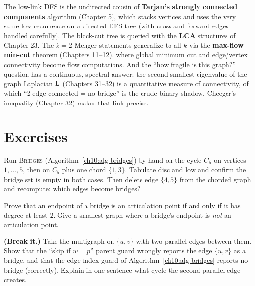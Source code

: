\begin{connectionbox}
The low-link DFS is the undirected cousin of \textbf{Tarjan's strongly connected
components} algorithm (Chapter 5), which stacks vertices and uses the very same
$\mathrm{low}$ recurrence on a directed DFS tree (with cross and forward edges handled
carefully). The block-cut tree is queried with the \textbf{LCA} structures of
Chapter 23. The $k=2$ Menger statements generalize to all $k$ via the
\textbf{max-flow min-cut} theorem (Chapters 11--12), where global minimum cut and
edge/vertex connectivity become flow computations. And the ``how fragile is this
graph?'' question has a continuous, spectral answer: the second-smallest eigenvalue of
the graph Laplacian $\mathbf{L}$ (Chapters 31--32) is a quantitative measure of
connectivity, of which ``$2$-edge-connected = no bridge'' is the crude binary shadow.
Cheeger's inequality (Chapter 32) makes that link precise.
\end{connectionbox}

\section{Exercises}
\label{ch10:exercises}

\begin{exercise}
Run \textsc{Bridges} (Algorithm~\ref{ch10:alg-bridges}) by hand on the cycle $C_5$ on
vertices $1,\dots,5$, then on $C_5$ plus one chord $\{1,3\}$. Tabulate $\mathrm{disc}$
and $\mathrm{low}$ and confirm the bridge set is empty in both cases. Then delete edge
$\{4,5\}$ from the chorded graph and recompute: which edges become bridges?
\end{exercise}

\begin{exercise}
Prove that an endpoint of a bridge is an articulation point if and only if it has degree
at least $2$. Give a smallest graph where a bridge's endpoint is \emph{not} an
articulation point.
\end{exercise}

\begin{exercise}
\textbf{(Break it.)} Take the multigraph on $\{u,v\}$ with two parallel edges between
them. Show that the ``skip if $w=p$'' parent guard wrongly reports the edge $\{u,v\}$
as a bridge, and that the edge-index guard of Algorithm~\ref{ch10:alg-bridges} reports
no bridge (correctly). Explain in one sentence what cycle the second parallel edge
creates.
\end{exercise}

